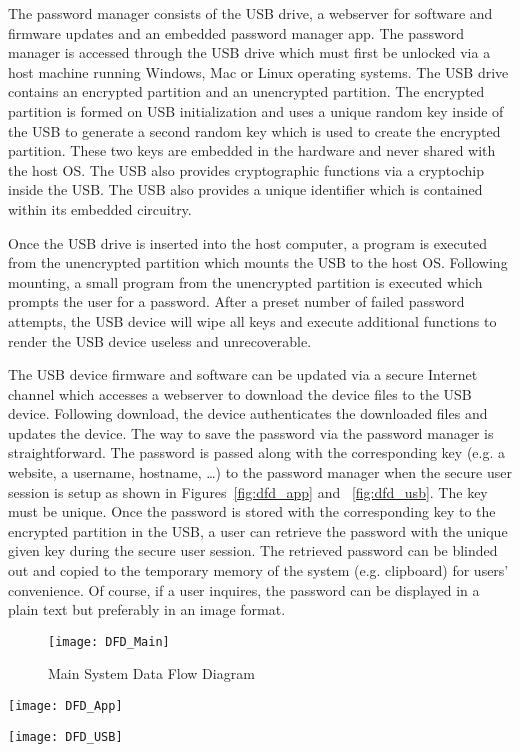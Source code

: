 The password manager consists of the USB drive, a webserver for software and
firmware updates and an embedded password manager app.  The password manager is
accessed through the USB drive which must first be unlocked via a host machine
running Windows, Mac or Linux operating systems. The USB drive contains an
encrypted partition and an unencrypted partition.  The encrypted partition is
formed on USB initialization and uses a unique random key inside of the USB to
generate a second random key which is used to create the encrypted
partition. These two keys are embedded in the hardware and never shared with the
host OS.  The USB also
provides cryptographic functions via a cryptochip inside the USB.  The USB also
provides a unique identifier which is contained within its embedded circuitry.
\par Once the USB drive is inserted into the host computer, a program is
executed from the unencrypted partition which mounts the USB to the host OS.
Following mounting, a small program from the unencrypted partition is executed
which prompts the user for a password. After a preset number of failed password
attempts, the USB device will wipe all keys and execute additional functions to
render the USB device useless and unrecoverable.
\par The USB device firmware and software can be updated via a secure Internet
channel which accesses a webserver to download the device files to the USB
device.  Following download, the device authenticates the downloaded files and
updates the device.
The way to save the password via the password manager is straightforward. The
password is passed along with the corresponding key (e.g. a website, a username,
hostname, \dots) to the password manager when the secure user session is
setup as shown in Figures~\ref{fig:dfd_app} and ~\ref{fig:dfd_usb}. The key
must be unique. Once
the password is stored with the corresponding key to the encrypted partition in
the USB, a user can retrieve the password with the unique given key during the
secure user session. The retrieved password can be blinded out and copied to the
temporary memory of the system (e.g. clipboard) for users' convenience. Of
course, if a user inquires, the password can be displayed in a plain text but
preferably in an image format.

\begin{figure}
    \centering
    \texttt{[image: DFD\_Main]}
    \caption{Main System Data Flow Diagram}
    \label{fig:dfd_main}
\end{figure}
\begin{figure*}
    \centering
    \texttt{[image: DFD\_App]}
    \caption{System Data Flow Diagram in the App side}
    \label{fig:dfd_app}
\end{figure*}
\begin{figure*}
    \centering
    \texttt{[image: DFD\_USB]}
    \caption{System Data Flow Diagram in the USB side}
    \label{fig:dfd_usb}
\end{figure*}

